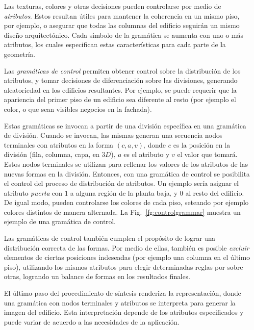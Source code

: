 Las texturas, colores y otras decisiones pueden controlarse por medio de {\em atributos}.
Estos resultan útiles para mantener la coherencia en un mismo piso, por ejemplo, o asegurar que todas las columnas del edificio seguirán un mismo diseño arquitectónico.
Cada símbolo de la gramática se aumenta con uno o más atributos, los cuales especifican estas características para cada parte de la geometría.


Las {\em gramáticas de control} permiten obtener control sobre la distribución de los atributos, y tomar decisiones de diferenciación sobre las divisiones, generando aleatoriedad en los edificios resultantes.
Por ejemplo, se puede requerir que la apariencia del primer piso de un edificio sea diferente al resto (por ejemplo el color, o que sean visibles negocios en la fachada).

Estas gramáticas se invocan a partir de una división específica en una gramática de división.
Cuando se invocan, las mismas generan una secuencia nodos terminales con atributos en la forma $(c,a,v)$, donde $c$ es la posición en la división (fila, columna, capa, en $3D$), $a$ es el atributo y $v$ el valor que tomará.
Estos nodos terminales se utilizan para rellenar los valores de los atributos de las nuevas formas en la división.
Entonces, con una gramática de control se posibilita el control del proceso de distribución de atributos.
Un ejemplo sería asignar el atributo {\em puerta} con $1$ a alguna región de la planta baja, y $0$ al resto del edificio.
De igual modo, pueden controlarse los colores de cada piso, seteando por ejemplo colores distintos de manera alternada.
La Fig.~\ref{fg:controlgrammar} muestra un ejemplo de una gramática de control.


Las gramáticas de control también cumplen el propósito de lograr una distribución correcta de las formas.
Por medio de ellas, también es posible {\em excluir} elementos de ciertas posiciones indeseadas (por ejemplo una columna en el último piso), utilizando los mismos atributos para elegir determinadas reglas por sobre otras, logrando un balance de formas en los resultados finales.

El último paso del procedimiento de síntesis renderiza la representación, donde una gramática con nodos terminales y atributos se interpreta para generar la imagen del edificio.
Esta interpretación depende de los atributos especificados y puede variar de acuerdo a las necesidades de la aplicación.

